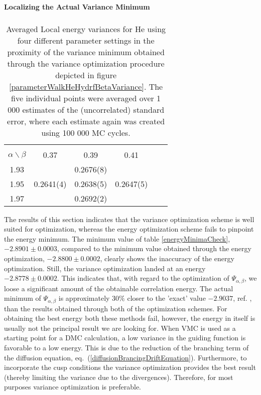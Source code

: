 \begin{table}[hbtp]
\begin{center} {\large \bf Localizing the Actual Variance Minimum} \\ 
$\phantom{a}$ \\
\begin{tabular}{cccccc}
\hline\\ 
$\alpha \backslash \beta$ & 0.37        & 0.39      & 0.41       \\
1.93                      &             & 0.2676(8) &            \\
1.95                      & 0.2641(4)   & 0.2638(5) & 0.2647(5)  \\
1.97                      &             & 0.2692(2) &            \\  [10pt]
\hline
\end{tabular} 
\end{center}
\caption{Averaged Local energy variances for He using four different
  parameter settings in the proximity of the variance minimum obtained
  through the variance optimization procedure depicted in figure
  \ref{parameterWalkHeHydrfBetaVariance}. The five individual points
  were averaged over 1 000 estimates of the (uncorrelated) standard
  error, where each estimate again was created using 100 000 MC
  cycles.}
  \label{varianceMinimaCheck}
\end{table}

The results of this section indicates that the variance optimization
scheme is well suited for optimization, whereas the energy
optimization scheme fails to pinpoint the energy minimum. The minimum
value of table \ref{energyMinimaCheck}, $-2.8901 \pm 0.0003$, compared
to the minimum value obtained through the energy optimization,
$-2.8800 \pm 0.0002$, clearly shows the inaccuracy of the energy
optimization. Still, the 
variance optimization landed at an energy $-2.8778 \pm 0.0002$. This
indicates that, with regard to the optimization of
$\Psi_{\alpha,\beta}$, we loose a significant amount of the obtainable
correlation energy. The actual minimum of $\Psi_{\alpha,\beta}$ is
approximately $30\%$ closer to the 'exact' value $-2.9037$, 
ref. \cite{hammond1994}, than the results obtained through both of the
optimization schemes. For obtaining the best energy both
these methods fail, however, the energy in itself is usually not the
principal result we are looking for. When VMC is used as a starting point
for a DMC calculation, a low variance in the guiding function is
favorable to a low energy. This is due to the reduction of the branching
term of the diffusion equation,
eq.~(\ref{diffusionBrancingDriftEquation}). Furthermore, to
incorporate the cusp conditions the variance optimization provides
the best result (thereby limiting the variance due to the
divergences). Therefore, for most purposes variance optimization is
preferable.


